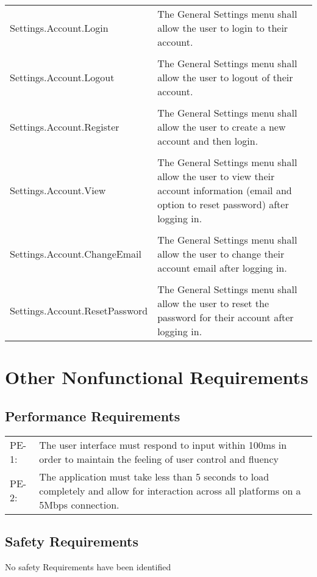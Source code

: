 \documentclass{scrreprt}
\begin{document}
\begin{center}
\begin{longtable}{ | p{6cm} | p{9cm} | }
\hline
Settings.Account.Login & The General Settings menu shall allow the user to login to their account. \\
& \\
Settings.Account.Logout & The General Settings menu shall allow the user to logout of their account. \\
& \\
Settings.Account.Register & The General Settings menu shall allow the user to create a new account and then login. \\
& \\
Settings.Account.View & The General Settings menu shall allow the user to view their account information (email and option to reset password) after logging in. \\
& \\
Settings.Account.ChangeEmail & The General Settings menu shall allow the user to change their account email after logging in. \\
& \\
Settings.Account.ResetPassword & The General Settings menu shall allow the user to reset the password for their account after logging in. \\
\hline
\end{longtable}
\end{center}

\chapter{Other Nonfunctional Requirements}

\section{Performance Requirements}
\begin{center}
\begin{tabular}{ p{1.5cm} p{13cm} }
PE-1: & The user interface must respond to input within 100ms in order to maintain
the feeling of user control and fluency\\
PE-2: & The application must take less than 5 seconds to load completely and allow
for interaction across all platforms on a 5Mbps connection.
\end{tabular}
\end{center}

\section{Safety Requirements}
No safety Requirements have been identified
\end{document}
